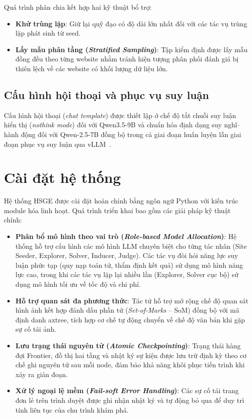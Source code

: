 Quá trình phân chia kết hợp hai kỹ thuật bổ trợ:
\begin{itemize}
  \item \textbf{Khử trùng lặp}: Giữ lại quỹ đạo có độ dài lớn nhất đối với các tác vụ trùng lặp phát sinh từ seed.
  \item \textbf{Lấy mẫu phân tầng (\textit{Stratified Sampling})}: Tập kiểm định được lấy mẫu đồng đều theo từng website nhằm tránh hiện tượng phân phối đánh giá bị thiên lệch về các website có khối lượng dữ liệu lớn.
\end{itemize}

\subsection{Cấu hình hội thoại và phục vụ suy luận}

Cấu hình hội thoại (\textit{chat template}) được thiết lập ở chế độ tắt chuỗi suy luận hiển thị (\textit{nothink mode}) đối với Qwen3.5-9B và chuẩn hóa định dạng suy nghĩ--hành động đối với Qwen-2.5-7B đồng bộ trong cả giai đoạn huấn luyện lẫn giai đoạn phục vụ suy luận qua vLLM~\cite{kwon2023vllm}.

\section{Cài đặt hệ thống}
\label{sec:method-impl}

Hệ thống HSGE được cài đặt hoàn chỉnh bằng ngôn ngữ Python với kiến trúc module hóa linh hoạt. Quá trình triển khai bao gồm các giải pháp kỹ thuật chính:
\begin{itemize}
  \item \textbf{Phân bổ mô hình theo vai trò (\textit{Role-based Model Allocation})}: Hệ thống hỗ trợ cấu hình các mô hình LLM chuyên biệt cho từng tác nhân (Site Seeder, Explorer, Solver, Inducer, Judge). Các tác vụ đòi hỏi năng lực suy luận phức tạp (quy nạp toán tử, thẩm định kết quả) sử dụng mô hình năng lực cao, trong khi các tác vụ lặp lại nhiều lần (Explorer, Solver cục bộ) sử dụng mô hình tối ưu về tốc độ và chi phí.
  \item \textbf{Hỗ trợ quan sát đa phương thức}: Tác tử hỗ trợ mở rộng chế độ quan sát hình ảnh kết hợp đánh dấu phần tử (\textit{Set-of-Marks} -- SoM) đồng bộ với mã định danh axtree, tích hợp cơ chế tự động chuyển về chế độ văn bản khi gặp sự cố tải ảnh.
  \item \textbf{Lưu trạng thái nguyên tử (\textit{Atomic Checkpointing})}: Trạng thái hàng đợi Frontier, đồ thị hai tầng và nhật ký sự kiện được lưu trữ định kỳ theo cơ chế ghi nguyên tử sau mỗi node, đảm bảo khả năng khôi phục tiến trình khi xảy ra gián đoạn.
  \item \textbf{Xử lý ngoại lệ mềm (\textit{Fail-soft Error Handling})}: Các sự cố tải trang đơn lẻ trên trình duyệt được ghi nhận nhật ký và tự động bỏ qua để duy trì tính liên tục của chu trình khám phá.
\end{itemize}
